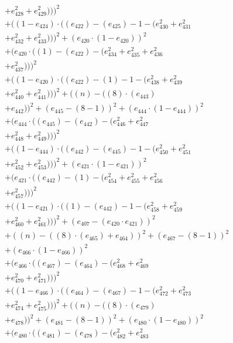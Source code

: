 \documentclass[10pt, a4paper]{article}
\begin{document}
\begin{align*}
& + e_{428}^{2} + e_{429}^{2})))^{2} \\
& + ((1 - e_{424})  \cdot  ((e_{422}) - (e_{425}) - 1 - (e_{430}^{2} + e_{431}^{2} \\
& + e_{432}^{2} + e_{433}^{2})))^{2} + (e_{420}  \cdot  (1 - e_{420}))^{2} \\
& + (e_{420}  \cdot  ((1) - (e_{422}) - (e_{434}^{2} + e_{435}^{2} + e_{436}^{2} \\
& + e_{437}^{2})))^{2} \\
& + ((1 - e_{420})  \cdot  ((e_{422}) - (1) - 1 - (e_{438}^{2} + e_{439}^{2} \\
& + e_{440}^{2} + e_{441}^{2})))^{2} + ((n) - ((8)  \cdot  (e_{443}) \\
& + e_{442}))^{2} + (e_{445} - (8 - 1))^{2} + (e_{444}  \cdot  (1 - e_{444}))^{2} \\
& + (e_{444}  \cdot  ((e_{445}) - (e_{442}) - (e_{446}^{2} + e_{447}^{2} \\
& + e_{448}^{2} + e_{449}^{2})))^{2} \\
& + ((1 - e_{444})  \cdot  ((e_{442}) - (e_{445}) - 1 - (e_{450}^{2} + e_{451}^{2} \\
& + e_{452}^{2} + e_{453}^{2})))^{2} + (e_{421}  \cdot  (1 - e_{421}))^{2} \\
& + (e_{421}  \cdot  ((e_{442}) - (1) - (e_{454}^{2} + e_{455}^{2} + e_{456}^{2} \\
& + e_{457}^{2})))^{2} \\
& + ((1 - e_{421})  \cdot  ((1) - (e_{442}) - 1 - (e_{458}^{2} + e_{459}^{2} \\
& + e_{460}^{2} + e_{461}^{2})))^{2} + (e_{407} - (e_{420}  \cdot  e_{421}))^{2} \\
& + ((n) - ((8)  \cdot  (e_{465}) + e_{464}))^{2} + (e_{467} - (8 - 1))^{2} \\
& + (e_{466}  \cdot  (1 - e_{466}))^{2} \\
& + (e_{466}  \cdot  ((e_{467}) - (e_{464}) - (e_{468}^{2} + e_{469}^{2} \\
& + e_{470}^{2} + e_{471}^{2})))^{2} \\
& + ((1 - e_{466})  \cdot  ((e_{464}) - (e_{467}) - 1 - (e_{472}^{2} + e_{473}^{2} \\
& + e_{474}^{2} + e_{475}^{2})))^{2} + ((n) - ((8)  \cdot  (e_{479}) \\
& + e_{478}))^{2} + (e_{481} - (8 - 1))^{2} + (e_{480}  \cdot  (1 - e_{480}))^{2} \\
& + (e_{480}  \cdot  ((e_{481}) - (e_{478}) - (e_{482}^{2} + e_{483}^{2} \\

\end{align*}
\end{document}
